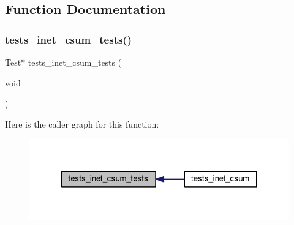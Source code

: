 \subsection{Function Documentation}
\mbox{\label{tests-inet__csum_8c_a71e3a236c33362e9bedcfb6d781f2751}} 
\subsubsection{\texorpdfstring{tests\+\_\+inet\+\_\+csum\+\_\+tests()}{tests\_inet\_csum\_tests()}}
{\footnotesize\ttfamily Test$\ast$ tests\+\_\+inet\+\_\+csum\+\_\+tests (\begin{DoxyParamCaption}\item[{void}]{ }\end{DoxyParamCaption})}

Here is the caller graph for this function\+:
\nopagebreak
\begin{figure}[H]
\begin{center}
\leavevmode
\includegraphics[width=321pt]{tests-inet__csum_8c_a71e3a236c33362e9bedcfb6d781f2751_icgraph}
\end{center}
\end{figure}
